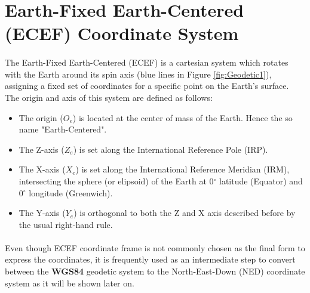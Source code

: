 \section{Earth-Fixed Earth-Centered (ECEF) Coordinate System}\label{sec:ecef}

\paragraph{}The Earth-Fixed Earth-Centered (ECEF) is a cartesian system which rotates with the Earth around its spin axis (blue lines in Figure \ref{fig:Geodetic1}), assigning a fixed set of coordinates for a specific point on the Earth's surface. The origin and axis of this system are defined as follows:
\begin{itemize}
\item{The origin (\textbf{$O_{e}$}) is located at the center of mass of the Earth. Hence the so name "Earth-Centered".}
\item{The Z-axis (\textbf{$Z_{e}$})} is set along the International Reference Pole (IRP).
\item{The X-axis (\textbf{$X_{e}$})} is set along the International Reference Meridian (IRM), intersecting the sphere (or elipsoid) of the Earth at 0$^{\circ}$ latitude (Equator) and 0$^{\circ}$ longitude (Greenwich).
\item{The Y-axis (\textbf{$Y_{e}$})} is orthogonal to both the Z and X axis described before by the usual right-hand rule.
\end{itemize}

\paragraph{}Even though ECEF coordinate frame is not commonly chosen as the final form to express the coordinates, it is frequently used as an intermediate step to convert between the \textbf{WGS84} geodetic system to the North-East-Down (NED) coordinate system as it will be shown later on.